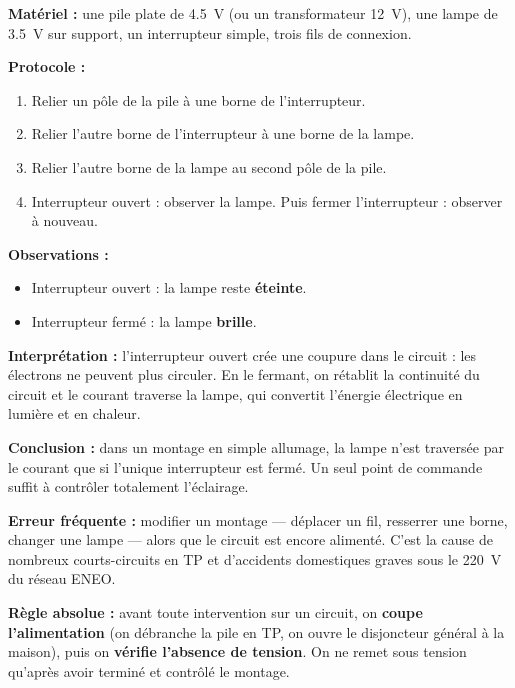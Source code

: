 \documentclass[11pt]{article}
\begin{document}
\begin{experience}
\textbf{Matériel :} une pile plate de \SI{4,5}{V} (ou un transformateur \SI{12}{V}), une lampe de \SI{3,5}{V} sur support, un interrupteur simple, trois fils de connexion.

\textbf{Protocole :}
\begin{enumerate}
\item Relier un pôle de la pile à une borne de l'interrupteur.
\item Relier l'autre borne de l'interrupteur à une borne de la lampe.
\item Relier l'autre borne de la lampe au second pôle de la pile.
\item Interrupteur ouvert : observer la lampe. Puis fermer l'interrupteur : observer à nouveau.
\end{enumerate}

\textbf{Observations :}
\begin{itemize}
\item Interrupteur ouvert : la lampe reste \textbf{éteinte}.
\item Interrupteur fermé : la lampe \textbf{brille}.
\end{itemize}

\textbf{Interprétation :} l'interrupteur ouvert crée une coupure dans le circuit : les électrons ne peuvent plus circuler. En le fermant, on rétablit la continuité du circuit et le courant traverse la lampe, qui convertit l'énergie électrique en lumière et en chaleur.

\textbf{Conclusion :} dans un montage en simple allumage, la lampe n'est traversée par le courant que si l'unique interrupteur est fermé. Un seul point de commande suffit à contrôler totalement l'éclairage.
\end{experience}

\begin{attention}
\textbf{Erreur fréquente :} modifier un montage — déplacer un fil, resserrer une borne, changer une lampe — alors que le circuit est encore alimenté. C'est la cause de nombreux courts-circuits en TP et d'accidents domestiques graves sous le \SI{220}{V} du réseau ENEO.

\textbf{Règle absolue :} avant toute intervention sur un circuit, on \textbf{coupe l'alimentation} (on débranche la pile en TP, on ouvre le disjoncteur général à la maison), puis on \textbf{vérifie l'absence de tension}. On ne remet sous tension qu'après avoir terminé et contrôlé le montage.
\end{attention}
\end{document}
